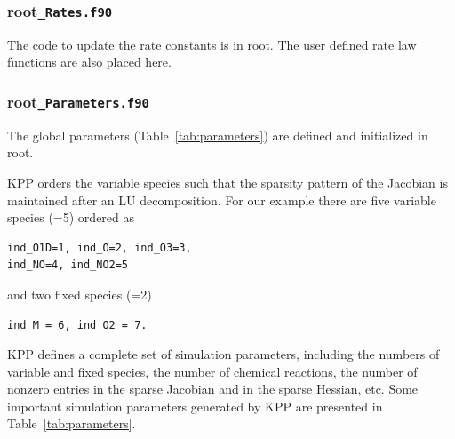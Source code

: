 \documentclass[twoside]{article}
\newcommand{\kpproot}{{\sc root}}
\begin{document}
\subsubsection{\kpproot{\tt\_Rates.f90}}
\label{sec:output-rates}

The code to update the rate constants is in \kpproot{}.
The user defined rate law functions are also placed here.

\subsubsection{\kpproot{\tt\_Parameters.f90}}
\label{sec:output-parameters}

The global parameters (Table~\ref{tab:parameters}) are defined and
initialized in \kpproot{}.

KPP orders the variable species such that the sparsity pattern of the
Jacobian is maintained after an LU decomposition. For our
 example there are five variable species
(=5) ordered as
%
\begin{verbatim}
ind_O1D=1, ind_O=2, ind_O3=3,
ind_NO=4, ind_NO2=5
\end{verbatim}
%
and two fixed species (=2)
%
\begin{verbatim}
ind_M = 6, ind_O2 = 7.
\end{verbatim}
%
KPP defines a complete set of simulation parameters, including the numbers
of variable and fixed species, the number of chemical reactions, the
number of nonzero entries in the sparse Jacobian and in the sparse
Hessian, etc. Some important simulation parameters generated by KPP are
presented in Table~\ref{tab:parameters}.
\end{document}
